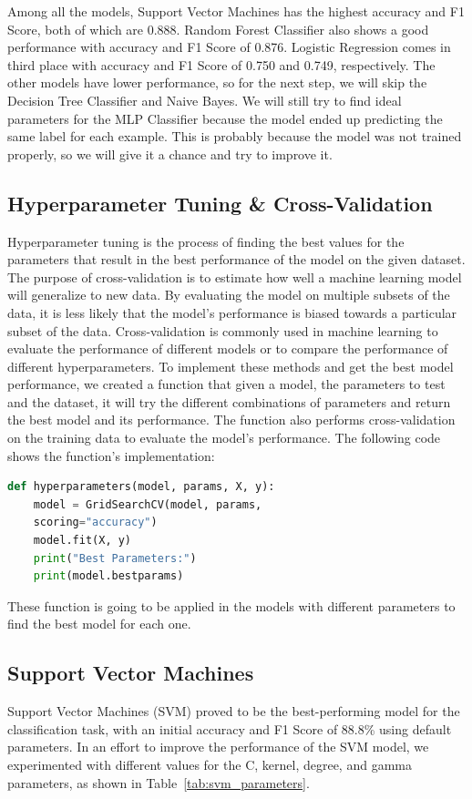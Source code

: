 \documentclass[conference]{IEEEtran}
\begin{document}
Among all the models, Support Vector Machines has the highest accuracy and F1 Score, both of which are 0.888. Random Forest Classifier also shows a good performance with accuracy and F1 Score of 0.876. Logistic Regression comes in third place with accuracy and F1 Score of 0.750 and 0.749, respectively.
The other models have lower performance, so for the next step, we will skip the Decision Tree Classifier and Naive Bayes. 
We will still try to find ideal parameters for the MLP Classifier because the model ended up predicting the same label for each example. This is probably because the model was not trained properly, so we will give it a chance and try to improve it.

\subsection{Hyperparameter Tuning \& Cross-Validation}
Hyperparameter tuning is the process of finding the best values for the parameters that result in the best performance of the model on the given dataset.
The purpose of cross-validation is to estimate how well a machine learning model will generalize to new data. By evaluating the model on multiple subsets of the data, it is less likely that the model's performance is biased towards a particular subset of the data. Cross-validation is commonly used in machine learning to evaluate the performance of different models or to compare the performance of different hyperparameters.
To implement these methods and get the best model performance, we created a function that given a model, the parameters to test and the dataset, it will try the different combinations of parameters and return the best model and its performance. The function also performs cross-validation on the training data to evaluate the model's performance. The following code shows the function's implementation:

\begin{lstlisting}[language=Python]
def hyperparameters(model, params, X, y):
    model = GridSearchCV(model, params, 
    scoring="accuracy")
    model.fit(X, y)
    print("Best Parameters:")
    print(model.bestparams)
\end{lstlisting}

These function is going to be applied in the models with different parameters to find the best model for each one.

\subsection{Support Vector Machines}
Support Vector Machines (SVM) proved to be the best-performing model for the classification task, with an initial accuracy and F1 Score of 88.8\% using default parameters. In an effort to improve the performance of the SVM model, we experimented with different values for the C, kernel, degree, and gamma parameters, as shown in Table~\ref{tab:svm_parameters}.
\end{document}
